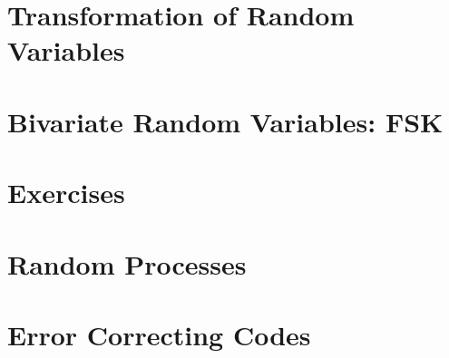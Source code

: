 \documentclass[journal]{IEEEtran}
\begin{document}
\section{Transformation of Random Variables}

\section{Bivariate Random Variables: FSK}

\section{Exercises}

\section{Random Processes}

\section{Error Correcting Codes}


% 
\backmatter
\fi
\appendix

\end{document}
